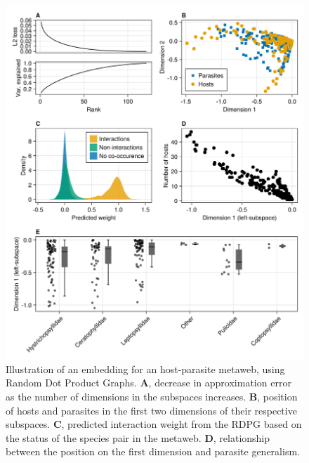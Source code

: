 \documentclass[10pt,oneside]{article}
\makeatletter
\def\maxwidth{\ifdim\Gin@nat@width>\linewidth\linewidth
\else\Gin@nat@width\fi}
\let\Oldincludegraphics\includegraphics
\renewcommand{\includegraphics}[1]{\Oldincludegraphics[width=\maxwidth]{#1}}
\makeatother
\begin{document}
\begin{figure}
\hypertarget{fig:illustration}{%
\centering
\includegraphics{figures/illustration.png}
\caption{Illustration of an embedding for an host-parasite metaweb,
using Random Dot Product Graphs. \textbf{A}, decrease in approximation
error as the number of dimensions in the subspaces increases.
\textbf{B}, position of hosts and parasites in the first two dimensions
of their respective subspaces. \textbf{C}, predicted interaction weight
from the RDPG based on the status of the species pair in the metaweb.
\textbf{D}, relationship between the position on the first dimension and
parasite generalism.}\label{fig:illustration}
}
\end{figure}
\end{document}

